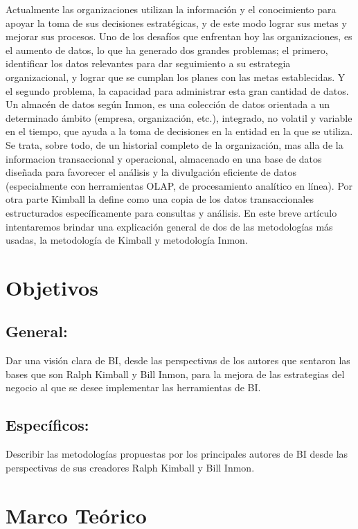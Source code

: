 \documentclass[%
 reprint,
 amsmath,amssymb,
 aps,
]{revtex4-1}
\begin{document}
Actualmente las organizaciones utilizan la información y el conocimiento para apoyar la toma de sus decisiones estratégicas, y de este modo lograr sus metas y mejorar sus procesos.
Uno de los desafíos que enfrentan hoy las organizaciones, es el aumento de datos, lo que ha generado dos grandes problemas; el primero, identificar los datos relevantes para dar seguimiento a su estrategia organizacional, y lograr que se cumplan los planes con las metas establecidas.
 Y el segundo problema, la capacidad para administrar esta gran cantidad de datos.
Un almacén de datos  según Inmon, es una colección de datos orientada a un determinado ámbito (empresa, organización, etc.), integrado, no volatil y variable en el tiempo, que ayuda a la toma de decisiones en la entidad en la que se utiliza. 
Se trata, sobre todo, de un historial completo de la organización, mas alla de la informacion transaccional y operacional, almacenado en una base de datos diseñada para favorecer el análisis y la divulgación eficiente de datos (especialmente con herramientas OLAP, de procesamiento analítico en línea). Por otra parte Kimball la define como una copia de los datos transaccionales estructurados específicamente para consultas y análisis. 
En este breve artículo intentaremos brindar una explicación general de dos de las metodologías más usadas, la metodología de Kimball y metodología Inmon. \cite{estrella1}
\section{Objetivos}\label{sec:2}
\subsection{General:}
Dar una visión clara de BI, desde las perspectivas de los autores que sentaron las bases que son Ralph Kimball y Bill Inmon, para la mejora de las estrategias del negocio al que se desee implementar las herramientas de BI.
\subsection{Específicos:}
 Describir las metodologías propuestas por los principales autores de BI desde las perspectivas de sus creadores Ralph Kimball y Bill Inmon.


\section {Marco Teórico}
\end{document}
